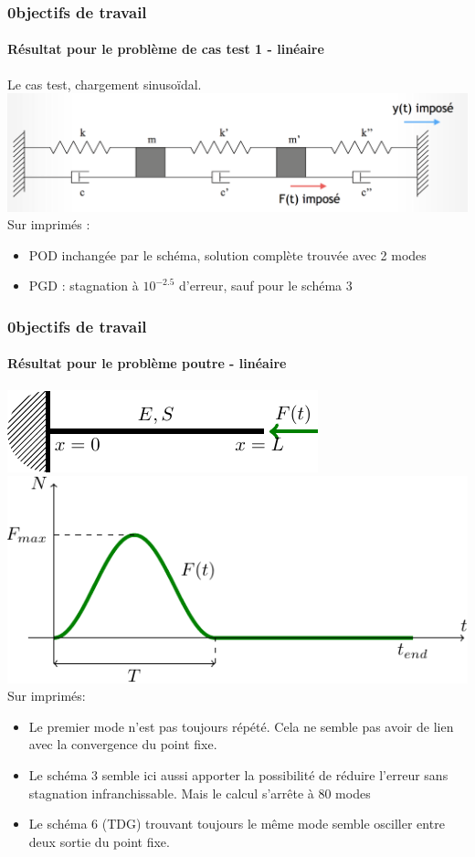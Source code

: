 \documentclass[12pt]{beamer}
\begin{document}
	\begin{frame}
		\frametitle{0bjectifs de travail}
			\framesubtitle{Résultat pour le problème de cas test 1 - linéaire }
				Le cas test, chargement sinusoïdal.
					\includegraphics[width=1\linewidth ,keepaspectratio]{CasTest1.png}
					\\
					Sur imprimés :
					\begin{itemize}
						\item POD inchangée par le schéma, solution complète trouvée avec 2 modes
						\item PGD : stagnation à $10^{-2.5}$ d'erreur, sauf pour le schéma 3
					\end{itemize}
	\end{frame}
	
	\begin{frame}
		\frametitle{0bjectifs de travail}
			\framesubtitle{Résultat pour le problème poutre - linéaire }
			\includegraphics[width=0.5\linewidth ,keepaspectratio]{Beam-tikz-0.pdf}				
			\includegraphics[width=0.5\linewidth ,keepaspectratio]{SinVerse-tikz.pdf}	
			\\
			Sur imprimés:
				\begin{itemize}
					\item Le premier mode n'est pas toujours répété. Cela ne semble pas avoir de lien avec la convergence du point fixe.
					\item Le schéma 3 semble ici aussi apporter la possibilité de réduire l'erreur sans stagnation infranchissable.
								Mais le calcul s'arrête à 80 modes
					\item Le schéma 6 (TDG) trouvant toujours le même mode semble osciller entre deux sortie du point fixe.
				\end{itemize}
	\end{frame}
	
\end{document}

